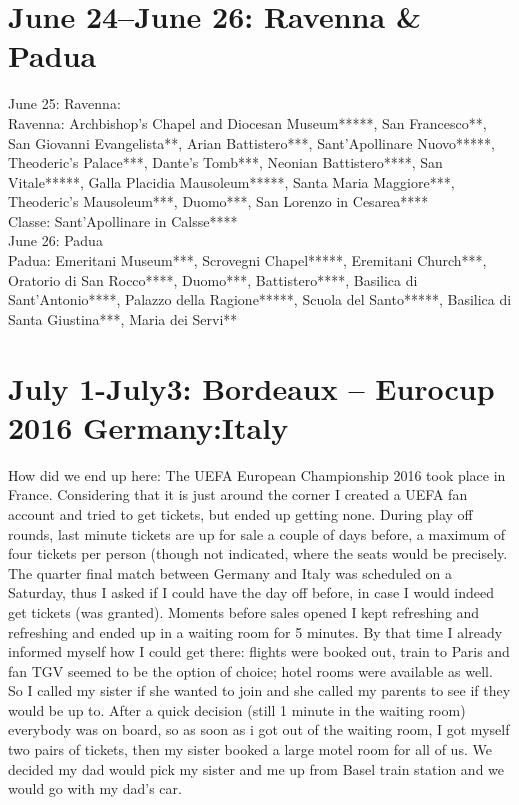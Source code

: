 \section{June 24--June 26: Ravenna \& Padua}
\label{RavennaPadua}

June 25: Ravenna:\\
Ravenna: Archbishop's Chapel and Diocesan Museum*****, San Francesco**, San Giovanni Evangelista**, Arian Battistero***, Sant'Apollinare Nuovo*****, Theoderic's Palace***, Dante's Tomb***, Neonian Battistero****, San Vitale*****, Galla Placidia Mausoleum*****, Santa Maria Maggiore***, Theoderic's Mausoleum***, Duomo***, San Lorenzo in Cesarea****\\
Classe: Sant'Apollinare in Calsse****\\

June 26: Padua\\
Padua: Emeritani Museum***, Scrovegni Chapel*****, Eremitani Church***, Oratorio di San Rocco****, Duomo***, Battistero****, Basilica di Sant'Antonio****, Palazzo della Ragione*****, Scuola del Santo*****, Basilica di Santa Giustina***, Maria dei Servi**

\section{July 1-July3: Bordeaux -- Eurocup 2016 Germany:Italy}
\label{2016:Bordeaux}

How did we end up here: The UEFA European Championship 2016 took place in France. Considering that it is just around the corner I created a UEFA fan account and tried to get tickets, but ended up getting none. During play off rounds, last minute tickets are up for sale a couple of days before, a maximum of four tickets per person (though not indicated, where the seats would be precisely. The quarter final match between Germany and Italy was scheduled on a Saturday, thus I asked if I could have the day off before, in case I would indeed get tickets (was granted). Moments before sales opened I kept refreshing and refreshing and ended up in a waiting room for 5 minutes. By that time I already informed myself how I could get there: flights were booked out, train to Paris and fan TGV seemed to be the option of choice; hotel rooms were available as well. So I called my sister if she wanted to join and she called my parents to see if they would be up to. After a quick decision (still 1 minute in the waiting room) everybody was on board, so as soon as i got out of the waiting room, I got myself two pairs of tickets, then my sister booked a large motel room for all of us. We decided my dad would pick my sister and me up from Basel train station and we would go with my dad's car.\\

